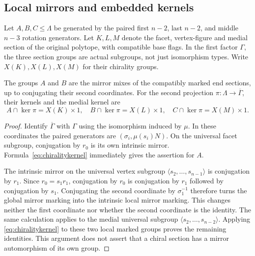 \subsection{Local mirrors and embedded kernels}
Let $A,B,C\leq\Lambda$ be generated by the paired first $n-2$, last $n-2$, and middle $n-3$ rotation generators. Let $K,L,M$ denote the facet, vertex-figure and medial section of the original polytope, with compatible base flags. In the first factor $\Gamma$, the three section groups are actual subgroups, not just isomorphism types. Write $X(K),X(L),X(M)$ for their chirality groups.

\begin{lemma}\label{lem:localmirror}
The groups $A$ and $B$ are the mirror mixes of the compatibly marked end sections, up to conjugating their second coordinates. For the second projection $\pi:\Lambda\to\overline\Gamma$, their kernels and the medial kernel are
\begin{equation}\label{eq:localX}
 A\cap\ker\pi=X(K)\times1,\quad
 B\cap\ker\pi=X(L)\times1,\quad
 C\cap\ker\pi=X(M)\times1.
\end{equation}
\end{lemma}
\begin{proof}
Identify $\overline\Gamma$ with $\Gamma$ using the isomorphism induced by $\mu$. In these coordinates the paired generators are $(\sigma_i,\mu(s_i)N)$. On the universal facet subgroup, conjugation by $r_0$ is its own intrinsic mirror. Formula~\eqref{eq:chiralitykernel} immediately gives the assertion for $A$.

The intrinsic mirror on the universal vertex subgroup $\langle s_2,\ldots,s_{n-1}\rangle$ is conjugation by $r_1$. Since $r_0=s_1r_1$, conjugation by $r_0$ is conjugation by $r_1$ followed by conjugation by $s_1$. Conjugating the second coordinate by $\sigma_1^{-1}$ therefore turns the global mirror marking into the intrinsic local mirror marking. This changes neither the first coordinate nor whether the second coordinate is the identity. The same calculation applies to the medial universal subgroup $\langle s_2,\ldots,s_{n-2}\rangle$. Applying \eqref{eq:chiralitykernel} to these two local marked groups proves the remaining identities. This argument does not assert that a chiral section has a mirror automorphism of its own group.
\end{proof}

